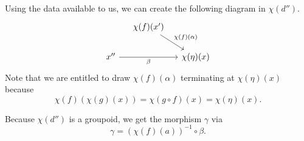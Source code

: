 \documentclass[main.tex]{subfiles}
\begin{document}
\begin{example}
\begin{itemize}
      Using the data available to us, we can create the following diagram in $\chi(d'')$.
      \begin{equation*}
        \begin{tikzcd}[column sep=small]
          & \chi(f)(x')
          \arrow[dr, "\chi(f)(\alpha)"]
          \\
          x''
          \arrow[rr, swap, "\beta"]
          && \chi(\eta)(x)
        \end{tikzcd}
      \end{equation*}
      Note that we are entitled to draw $\chi(f)(\alpha)$ terminating at $\chi(\eta)(x)$ because
      \begin{equation*}
        \chi(f)(\chi(g)(x)) = \chi(g \circ f)(x) = \chi(\eta)(x).
      \end{equation*}

      Because $\chi(d'')$ is a groupoid, we get the morphism $\gamma$ via
      \begin{equation*}
        \gamma = (\chi(f)(a))^{-1} \circ \beta.
      \end{equation*}
  \end{itemize}

\end{example}
\end{document}
